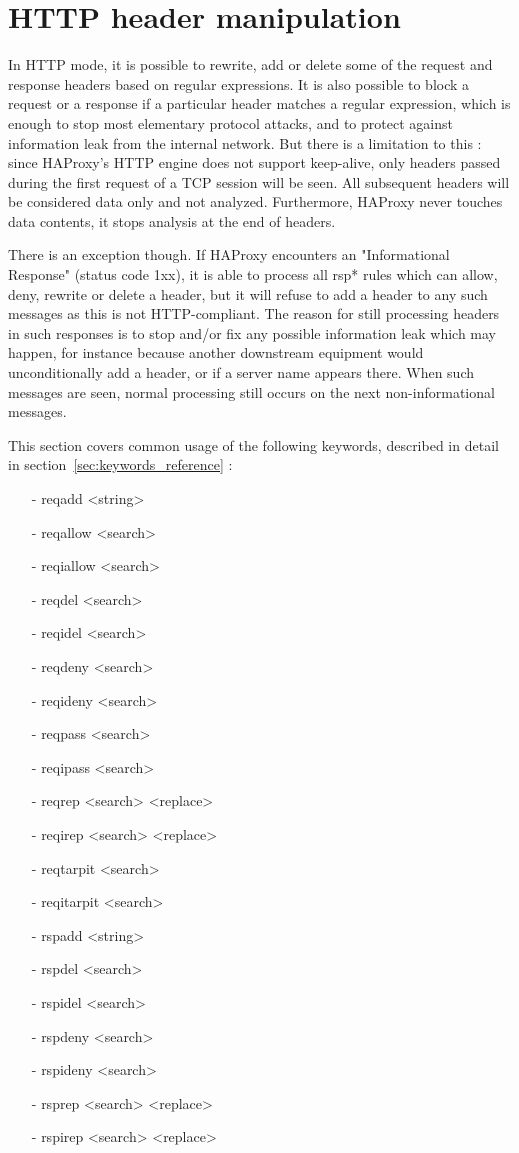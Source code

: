 \chapter{HTTP header manipulation}
\label{chap:header_manipulation}

In HTTP mode, it is possible to rewrite, add or delete some of the request and
response headers based on regular expressions. It is also possible to block a
request or a response if a particular header matches a regular expression,
which is enough to stop most elementary protocol attacks, and to protect
against information leak from the internal network. But there is a limitation
to this : since HAProxy's HTTP engine does not support keep-alive, only headers
passed during the first request of a TCP session will be seen. All subsequent
headers will be considered data only and not analyzed. Furthermore, HAProxy
never touches data contents, it stops analysis at the end of headers.

There is an exception though. If HAProxy encounters an "Informational Response"
(status code 1xx), it is able to process all rsp* rules which can allow, deny,
rewrite or delete a header, but it will refuse to add a header to any such
messages as this is not HTTP-compliant. The reason for still processing headers
in such responses is to stop and/or fix any possible information leak which may
happen, for instance because another downstream equipment would unconditionally
add a header, or if a server name appears there. When such messages are seen,
normal processing still occurs on the next non-informational messages.

This section covers common usage of the following keywords, described in detail
in section~\ref{sec:keywords_reference} :
\begin{itemize}
\item[-] reqadd     <string>
\item[-] reqallow   <search>
\item[-] reqiallow  <search>
\item[-] reqdel     <search>
\item[-] reqidel    <search>
\item[-] reqdeny    <search>
\item[-] reqideny   <search>
\item[-] reqpass    <search>
\item[-] reqipass   <search>
\item[-] reqrep     <search> <replace>
\item[-] reqirep    <search> <replace>
\item[-] reqtarpit  <search>
\item[-] reqitarpit <search>
\item[-] rspadd     <string>
\item[-] rspdel     <search>
\item[-] rspidel    <search>
\item[-] rspdeny    <search>
\item[-] rspideny   <search>
\item[-] rsprep     <search> <replace>
\item[-] rspirep    <search> <replace>
\end{itemize}

